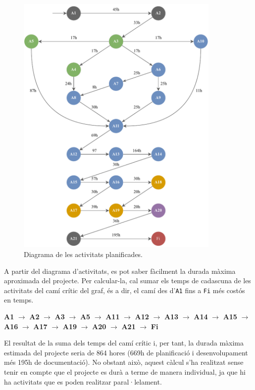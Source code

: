 \documentclass[a4paper,12pt]{ThesisStyle}
\begin{document}
\begin{figure}[H]
  \centering
	\includegraphics[width=0.88\textwidth]{assets/planification_figs/activityDiagram.pdf}
	\caption{\label{img:diagrama_activitats}Diagrama de les activitats planificades.}
\end{figure}

A partir del diagrama d'activitats, es pot saber fàcilment la durada màxima aproximada del projecte. Per calcular-la, cal sumar els temps de cadascuna de les activitats del camí crític del graf, és a dir, el camí des d'\texttt{A1} fins a \texttt{Fi} més costós en temps.

\textbf{A1} $\rightarrow$ \textbf{A2} $\rightarrow$ \textbf{A3} $\rightarrow$ \textbf{A5} $\rightarrow$ \textbf{A11} $\rightarrow$ \textbf{A12} $\rightarrow$ \textbf{A13} $\rightarrow$ \textbf{A14} $\rightarrow$ \textbf{A15} $\rightarrow$ \textbf{A16} $\rightarrow$ \textbf{A17} $\rightarrow$ \textbf{A19} $\rightarrow$ \textbf{A20} $\rightarrow$ \textbf{A21} $\rightarrow$ \textbf{Fi}

El resultat de la suma dels temps del camí crític i, per tant, la durada màxima estimada del projecte seria de 864 hores (669h de planificació i desenvolupament més 195h de documentació). No obstant això, aquest càlcul s'ha realitzat sense tenir en compte que el projecte es durà a terme de manera individual, ja que hi ha activitats que es poden realitzar paral·lelament.
\end{document}
